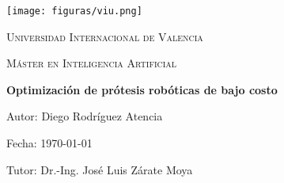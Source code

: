 
\begin{titlepage}
    \centering
    \vspace*{1cm}

    \texttt{[image: figuras/viu.png]}\par\vspace{1cm}

    {\scshape\LARGE Universidad Internacional de Valencia\par}
    \vspace{1cm}
    {\scshape\Large Máster en Inteligencia Artificial\par}
    \vspace{1.5cm}

    {\huge\bfseries Optimización de prótesis robóticas de bajo costo\par}
    \vspace{2cm}

    {\Large Autor: Diego Rodríguez Atencia\par}
    \vfill

    {\large Fecha: \today\par}

    \vspace{0.8cm}
    \begin{flushleft}
        \large Tutor: Dr.-Ing. José Luis Zárate Moya\par

\end{flushleft}
\end{titlepage}
